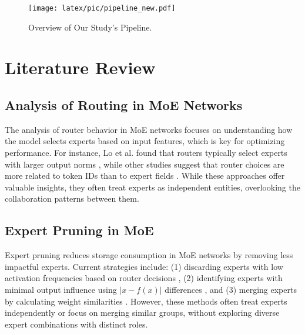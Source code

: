 \documentclass[11pt]{article}
\begin{document}
\begin{figure*}[ht]
    \centering
    \texttt{[image: latex/pic/pipeline\_new.pdf]}
    \caption{Overview of Our Study's Pipeline.}
    \label{pipeline}
\end{figure*}




\section{Literature Review}


\subsection{Analysis of Routing in MoE Networks}

The analysis of router behavior in MoE networks focuses on understanding how the model selects experts based on input features, which is key for optimizing performance. For instance, Lo et al. found that routers typically select experts with larger output norms \cite{lo_closer_2024}, while other studies suggest that router choices are more related to token IDs than to expert fields \cite{jiang_mixtral_2024, xue_openmoe_2024, dai_deepseekmoe_2024}. While these approaches offer valuable insights, they often treat experts as independent entities, overlooking the collaboration patterns between them.



\subsection{Expert Pruning in MoE}

Expert pruning reduces storage consumption in MoE networks by removing less impactful experts. Current strategies include: (1) discarding experts with low activation frequencies based on router decisions \cite{muzio_seer-moe_2024}, (2) identifying experts with minimal output influence using $|x - f(x)|$ differences \cite{lu_not_2024, he_demystifying_2024}, and (3) merging experts by calculating weight similarities \cite{li_merge_2024, zhang_diversifying_2024}. However, these methods often treat experts independently or focus on merging similar groups, without exploring diverse expert combinations with distinct roles.
\end{document}
